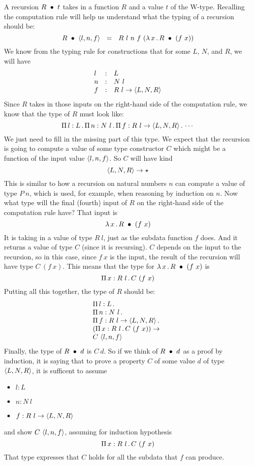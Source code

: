 \documentclass{article}
\begin{document}
A recursion $R\ \bullet\ t$ takes in a function $R$ and a value $t$ of the W-type.
Recalling the computation rule will help us understand what the typing of a recursion
should be:
\[
\wrec{R}{\ctora{l}{n}{f}} \ \ = \ \ R\ l\ n\ f\ (\lam{x}{\wrec{R}{(f\ x)}})
\]
\noindent We know from the typing rule for constructions that for some $L$, $N$, and $R$, we will have
\[
\begin{array}{lll}
  l & : & L \\
  n & : & N\ l \\
  f & : & R\ l \to \langle L , N , R \rangle
\end{array}
\]
\noindent Since $R$ takes in those inputs on the right-hand side of the computation rule,
we know that the type of $R$ must look like:
\[
\Pia{l}{L}{\Pia{n}{N\ l}{\Pia{f}{R\ l \to \w{L}{N}{R}}{\cdots}}}
\]
\noindent We just need to fill in the missing part of this type.  We expect that
the recursion is going to compute a value of some type constructor $C$ which might
be a function of the input value $\langle l , n, f \rangle$.  So $C$ will have kind
\[
\langle L , N , R \rangle \to \star
\]
\noindent This is similar to how a recursion on natural numbers $n$ can compute a value of type $P\ n$,
which is used, for example, when reasoning by induction on $n$.  Now what type will the final (fourth)
input of $R$ on the right-hand side of the computation rule have?  That input is
\[
\lambda\, x\, .\, R\ \bullet\ (f\ x)
\]
\noindent It is taking in a value of type $R\ l$, just as the subdata function $f$ does.  And it returns
a value of type $C$ (since it is recursing).  $C$ depends on the input to the recursion, so in this case,
since $f\ x$ is the input, the result of the recursion will have type $C\ (f\ x)$.  This means that the
type for $\lambda\, x\, .\, R\ \bullet\ (f\ x)$ is
\[
\Pi\, x: R\ l\, .\, C\ (f\ x)
\]
\noindent Putting all this together, the type of $R$ should be:
\[
\begin{array}{l}
  \Pi\, l: L\, .\, \ \\
  \Pi\, n: N\ l\, .\, \ \\
  \Pi\, f: R\ l \to \langle L , N , R \rangle\, .\, \  \\
  (\Pi\, x: R\ l\, .\, C\ (f\ x)) \to \\
  C\ \langle l , n, f \rangle
  \end{array}
\]
\noindent Finally, the type of $R\ \bullet\ d$ is $C\ d$.  So if we think of $R\ \bullet\ d$
as a proof by induction, it is saying that to prove a property $C$ of some value $d$ of
type $\langle L , N , R \rangle$, it is sufficent to assume

\begin{itemize}
\item $l : L$
\item $n : N\ l$
\item $f:R\ l \to \langle L , N , R \rangle$
\end{itemize}

\noindent and show $C\ \langle l , n, f \rangle$, assuming for induction hypothesis
\[
\Pi\, x: R\ l\, .\, C\ (f\ x)
\]
\noindent That type expresses that $C$ holds for all the subdata that $f$ can produce.



\end{document}
